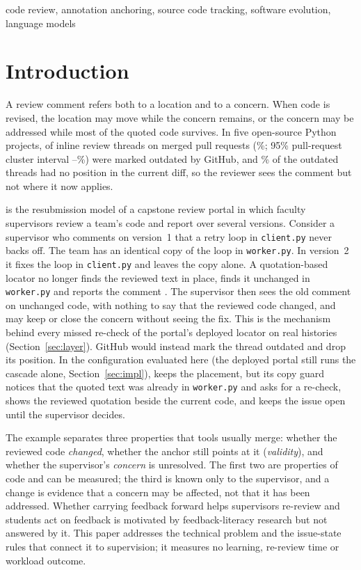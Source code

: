\begin{IEEEkeywords}
code review, annotation anchoring, source code tracking, software evolution, language models
\end{IEEEkeywords}

\section{Introduction}
A review comment refers both to a location and to a concern. When code is revised, the location may move while the concern remains, or the concern may be addressed while most of the quoted code survives. In five open-source Python projects, \wpeOutdated{} of \wpeThreads{} inline review threads on merged pull requests (\wpeOutdatedPct\%; 95\% pull-request cluster interval \wpeOutdatedLo--\wpeOutdatedHi\%) were marked outdated by GitHub, and \wpeNullLinePct\% of the outdated threads had no position in the current diff, so the reviewer sees the comment but not where it now applies.

\sys{} is the resubmission model of a capstone review portal in which faculty supervisors review a team's code and report over several versions. Consider a supervisor who comments on version~1 that a retry loop in \texttt{client.py} never backs off. The team has an identical copy of the loop in \texttt{worker.py}. In version~2 it fixes the loop in \texttt{client.py} and leaves the copy alone. A quotation-based locator no longer finds the reviewed text in place, finds it unchanged in \texttt{worker.py} and reports the comment . The supervisor then sees the old comment on unchanged code, with nothing to say that the reviewed code changed, and may keep or close the concern without seeing the fix. This is the mechanism behind every missed re-check of the portal's deployed locator on real histories (Section~\ref{sec:layer}). GitHub would instead mark the thread outdated and drop its position. In the configuration evaluated here (the deployed portal still runs the cascade alone, Section~\ref{sec:impl}), \sys{} keeps the placement, but its copy guard notices that the quoted text was already in \texttt{worker.py} and asks for a re-check, shows the reviewed quotation beside the current code, and keeps the issue open until the supervisor decides.

The example separates three properties that tools usually merge: whether the reviewed code \emph{changed}, whether the anchor still points at it (\emph{validity}), and whether the supervisor's \emph{concern} is unresolved. The first two are properties of code and can be measured; the third is known only to the supervisor, and a change is evidence that a concern may be affected, not that it has been addressed. Whether carrying feedback forward helps supervisors re-review and students act on feedback is motivated by feedback-literacy research \cite{carless2018feedback,winstone2017supporting} but not answered by it. This paper addresses the technical problem and the issue-state rules that connect it to supervision; it measures no learning, re-review time or workload outcome.

